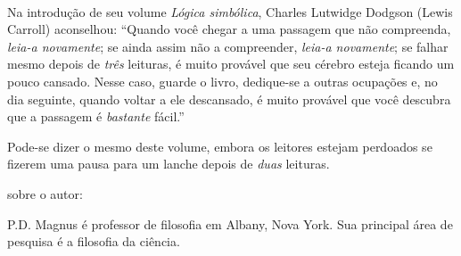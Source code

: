 \thispagestyle{empty}
\onecolumn
\ 
\vfill

\parbox{3 in}{
Na introdução de seu volume \emph{Lógica simbólica}, Charles Lutwidge Dodgson (Lewis Carroll) aconselhou: ``Quando você chegar a uma passagem que não compreenda, \emph{leia-a novamente}; se ainda assim não a compreender, \emph{leia-a novamente}; se falhar mesmo depois de \emph{três} leituras, é muito provável que seu cérebro esteja ficando um pouco cansado. Nesse caso, guarde o livro, dedique-se a outras ocupações e, no dia seguinte, quando voltar a ele descansado, é muito provável que você descubra que a passagem é \emph{bastante} fácil.''

\medskip

Pode-se dizer o mesmo deste volume, embora os leitores estejam perdoados se fizerem uma pausa para um lanche depois de \emph{duas} leituras.
}

\vfill

\parbox{3 in}{
{\sf sobre o autor:}
\medskip

P.D. Magnus é professor de filosofia em Albany, Nova York. Sua principal área de pesquisa é a filosofia da ciência.
}
\vfill
